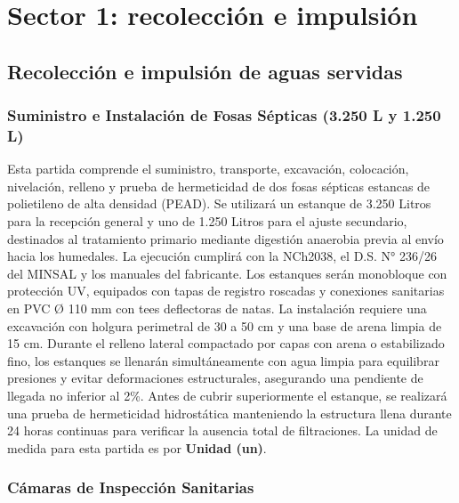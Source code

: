
\section{Sector 1: recolección e impulsión}

\subsection{Recolección e impulsión de aguas servidas}

\subsubsection*{Suministro e Instalación de Fosas Sépticas (3.250 L y 1.250 L)}

Esta partida comprende el suministro, transporte, excavación, colocación, nivelación, relleno y prueba de hermeticidad de dos fosas sépticas estancas de polietileno de alta densidad (PEAD). Se utilizará un estanque de 3.250 Litros para la recepción general y uno de 1.250 Litros para el ajuste secundario, destinados al tratamiento primario mediante digestión anaerobia previa al envío hacia los humedales. La ejecución cumplirá con la NCh2038, el D.S. N° 236/26 del MINSAL y los manuales del fabricante. Los estanques serán monobloque con protección UV, equipados con tapas de registro roscadas y conexiones sanitarias en PVC Ø 110 mm con tees deflectoras de natas. La instalación requiere una excavación con holgura perimetral de 30 a 50 cm y una base de arena limpia de 15 cm. Durante el relleno lateral compactado por capas con arena o estabilizado fino, los estanques se llenarán simultáneamente con agua limpia para equilibrar presiones y evitar deformaciones estructurales, asegurando una pendiente de llegada no inferior al 2\%. Antes de cubrir superiormente el estanque, se realizará una prueba de hermeticidad hidrostática manteniendo la estructura llena durante 24 horas continuas para verificar la ausencia total de filtraciones. La unidad de medida para esta partida es por \textbf{Unidad (un)}.

\subsubsection*{Cámaras de Inspección Sanitarias}

